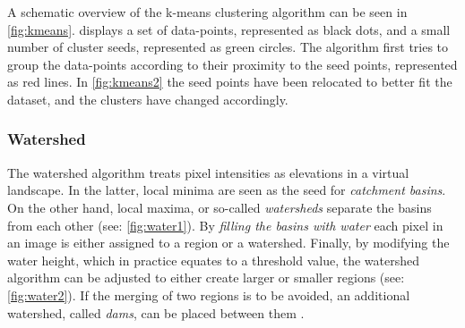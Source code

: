 \noindent
A schematic overview of the k-means clustering algorithm can be seen in \cref{fig:kmeans}.
 displays a set of data-points, represented as black dots, and a small number of
cluster seeds, represented as green circles.
The algorithm first tries to group the data-points according to their proximity to the seed points, represented as red lines.
In \cref{fig:kmeans2} the seed points have been relocated to better fit the dataset, and the clusters have changed accordingly.


\subsubsection{Watershed}
The watershed algorithm treats pixel intensities as elevations in a virtual landscape.
In the latter, local minima are seen as the seed for \textit{catchment basins}.
On the other hand, local maxima, or so-called \textit{watersheds} separate the basins from each other (see: \cref{fig:water1}).
By \textit{filling the basins with water} each pixel in an image is either assigned to a region or a watershed.
Finally, by modifying the water height, which in practice equates to a threshold value,
the watershed algorithm can be adjusted to either create larger or smaller regions (see: \cref{fig:water2}).
If the merging of two regions is to be avoided, an additional watershed, called \textit{dams},
can be placed between them \cite{preimImageAnalysisMedical2014,hahnIWTinteractiveWatershedTransform2003}.
